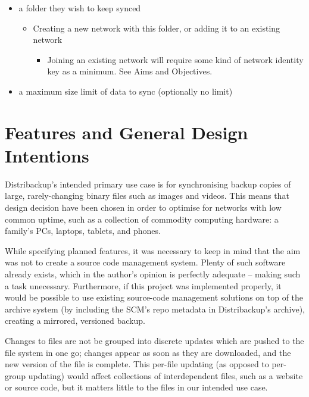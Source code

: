 \documentclass[12pt,a4paper,]{adreport}
\begin{document}
\begin{itemize}
\itemsep1pt\parskip0pt
\item
  a folder they wish to keep synced

  \begin{itemize}
  \itemsep1pt\parskip0pt
  \item
    Creating a new network with this folder, or adding it to an existing
    network

    \begin{itemize}
    \itemsep1pt\parskip0pt
    \item
      Joining an existing network will require some kind of network
      identity key as a minimum. See Aims and Objectives.
    \end{itemize}
  \end{itemize}
\item
  a maximum size limit of data to sync (optionally no limit)
\end{itemize}

\section{Features and General Design
Intentions}\label{features-and-general-design-intentions}

Distribackup's intended primary use case is for synchronising backup
copies of large, rarely-changing binary files such as images and videos.
This means that design decision have been chosen in order to optimise
for networks with low common uptime, such as a collection of commodity
computing hardware: a family's PCs, laptops, tablets, and phones.

While specifying planned features, it was necessary to keep in mind that
the aim was not to create a source code management system. Plenty of
such software already exists, which in the author's opinion is perfectly
adequate -- making such a task unecessary. Furthermore, if this project
was implemented properly, it would be possible to use existing
source-code management solutions on top of the archive system (by
including the SCM's repo metadata in Distribackup's archive), creating a
mirrored, versioned backup.

Changes to files are not be grouped into discrete updates which are
pushed to the file system in one go; changes appear as soon as they are
downloaded, and the new version of the file is complete. This per-file
updating (as opposed to per-group updating) would affect collections of
interdependent files, such as a website or source code, but it matters
little to the files in our intended use case.
\end{document}
